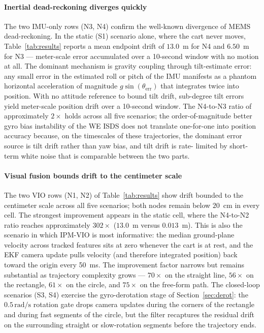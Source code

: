 \documentclass[conference]{IEEEtran}
\begin{document}
\paragraph*{Inertial dead-reckoning diverges quickly}
The two IMU-only rows (N3, N4) confirm the well-known divergence of
MEMS dead-reckoning. In the static (S1) scenario alone, where the
cart never moves, Table~\ref{tab:results} reports a mean endpoint
drift of $13.0$~m for N4 and $6.50$~m for N3 --- meter-scale error
accumulated over a 10-second window with no motion at all. The
dominant mechanism is gravity coupling through tilt-estimate error:
any small error in the estimated roll or pitch of the IMU manifests
as a phantom horizontal acceleration of magnitude
$g \sin(\theta_{\mathrm{err}})$ that integrates twice into position.
With no attitude reference to bound tilt drift, sub-degree tilt
errors yield meter-scale position drift over a 10-second window. The
N4-to-N3 ratio of approximately $2\times$ holds across all five
scenarios; the order-of-magnitude better gyro bias instability of the
WE ISDS does not translate one-for-one into position accuracy
because, on the timescales of these trajectories, the dominant error
source is tilt drift rather than yaw bias, and tilt drift is rate-
limited by short-term white noise that is comparable between the two
parts.

\paragraph*{Visual fusion bounds drift to the centimeter scale}
The two VIO rows (N1, N2) of Table~\ref{tab:results} show drift
bounded to the centimeter scale across all five scenarios; both nodes
remain below $20$~cm in every cell. The strongest improvement appears
in the static cell, where the N4-to-N2 ratio reaches approximately
$302\times$ ($13.0$~m versus $0.013$~m). This is also the scenario in
which IPM-VIO is most informative: the median ground-plane velocity
across tracked features sits at zero whenever the cart is at rest,
and the EKF camera update pulls velocity (and therefore integrated
position) back toward the origin every 50~ms. The improvement factor
narrows but remains substantial as trajectory complexity grows ---
$70\times$ on the straight line, $56\times$ on the rectangle,
$61\times$ on the circle, and $75\times$ on the free-form path. The
closed-loop scenarios (S3, S4) exercise the gyro-derotation stage of
Section~\ref{sec:derot}: the $0.5\,\mathrm{rad/s}$ rotation gate
drops camera updates during the corners of the rectangle and during
fast segments of the circle, but the filter recaptures the residual
drift on the surrounding straight or slow-rotation segments before
the trajectory ends.
\end{document}
